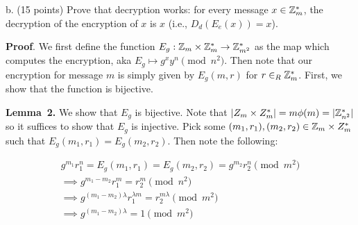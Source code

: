 \documentclass{article}
\begin{document}
\begin{enumerate}
\begin{itemize}
\mdfloatright{\ensuremath{\Box}}%

b. (15 points) Prove that decryption works: for every message $x\in \mathbb{Z}^*_m$, the decryption of the encryption of $x$ is $x$ (i.e., $D_d(E_e(x))=x$).%

\begin{mdbmarginx}{1ex}{0pt}{1ex}{0pt}%
\noindent{}\textbf{Proof}.  We first define the function $E_g: \mathbb{Z}_m \times \mathbb{Z}^*_m \to \mathbb{Z}_{m^2}^*$ as the map 
which computes the encryption, aka $E_g \mapsto g^xy^n \pmod n^2$. Then note
that our encryption for message $m$ is simply given by $E_g(m,r)$ for $r \in_R \mathbb{Z}_m^*$. First,
we show that the function is bijective.%
\end{mdbmarginx}%

\begin{mdbmarginx}{1ex}{0pt}{1ex}{0pt}%
\noindent{}\textbf{Lemma~2.} \mdbr
{}We show that $E_g$ is bijective. Note that $|Z_m \times Z_m^*| = m\phi(m) = |\mathbb{Z}_{n^2}^*|$ so it
suffices to show that $E_g$ is injective. Pick some $(m_1,r_1),(m_2,r_2) \in \mathbb{Z}_m \times Z_m^*$
such that $E_g(m_1, r_1) = E_g(m_2,r_2)$. Then note the following:%
\end{mdbmarginx}%
\noindent\noindent\[%
\begin{aligned}
  g^{m_1}r_1^n = E_g(m_1,r_1) = E_g(m_2,r_2) = g^{m_2}r_2^n \pmod{m^2}\\
  \implies g^{m_1 - m_2}r_1^m = r_2^m \pmod{n^2} \\
  \implies  g^{(m_1 - m_2)\lambda} r_1^{\lambda m} = r_2^{m\lambda} \pmod{m^2} \\
  \implies g^{(m_1 - m_2)\lambda} = 1 \pmod {m^2}
\end{aligned}
\]%


\end{itemize}
\end{enumerate}
\end{document}
